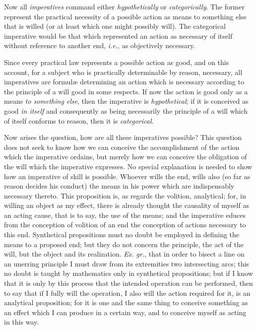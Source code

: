Now all \textit{imperatives} command either \textit{hypothetically} or
\textit{categorically}. The former represent the practical necessity
of a possible action as means to something else that is willed (or at
least which one might possibly will). The categorical imperative would
be that which represented an action as necessary of itself without
reference to another end, \textit{i.e.}, as objectively necessary.

Since every practical law represents a possible action as good, and on
this account, for a subject who is practically determinable by reason,
necessary, all imperatives are formul\ae{} determining an action which
is necessary according to the principle of a will good in some
respects. If now the action is good only as a means \textit{to
something else}, then the imperative is \textit{hypothetical}; if it
is conceived as good \textit{in itself} and consequently as being
necessarily the principle of a will which of itself conforms to
reason, then it is \textit{categorical}.

\snip

Now arises the question, how are all these imperatives
possible? This question does not seek to know how we can conceive the
accomplishment of the action which the imperative ordains, but merely
how we can conceive the obligation of the will which the imperative
expresses. No special explanation is needed to show how an imperative
of skill is possible. Whoever wills the end, wills also (so far as
reason decides his conduct) the means in his power which are
indispensably necessary thereto. This proposition is, as regards the
volition, analytical; for, in willing an object as my effect, there is
already thought the causality of myself as an acting cause, that is to
say, the use of the means; and the imperative educes from the
conception of volition of an end the conception of actions necessary
to this end. Synthetical propositions must no doubt be employed in
defining the means to a proposed end; but they do not concern the
principle, the act of the will, but the object and its realization.
\textit{Ex. gr.}, that in order to bisect a line on an unerring
principle I must draw from its extremities two intersecting arcs; this
no doubt is taught by mathematics only in synthetical propositions;
but if I know that it is only by this process that the intended
operation can be performed, then to say that if I fully will the
operation, I also will the action required for it, is an analytical
proposition; for it is one and the same thing to conceive something as
an effect which I can  produce in a certain way, and to
conceive myself as acting in this way.

